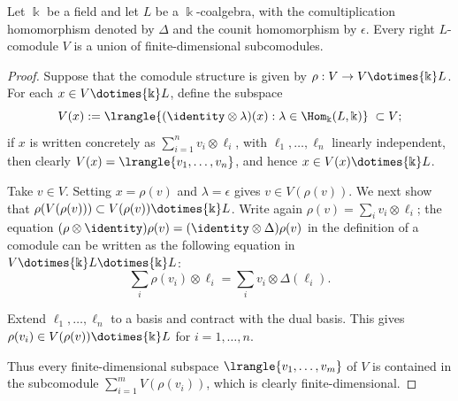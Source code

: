 \begin{lemma}\label{prop:comodule-fd-union}
	Let $\Bbbk$ be a field and let $L$ be a $\Bbbk$-coalgebra, with the
	comultiplication homomorphism denoted by $\Delta$ and the counit
	homomorphism by $\epsilon$. Every right $L$-comodule $V$ is a union of
	finite-dimensional subcomodules.
\end{lemma}
\begin{proof}
	Suppose that the comodule structure is given by
	$\rho: V \to V \dotimes{\Bbbk} L$. For each
	$x \in V \dotimes{\Bbbk} L$, define the subspace
	\[ V(x) := \lrangle{(\identity \otimes \lambda)(x) : \lambda \in \Hom_{\Bbbk}(L, \Bbbk) } \; \subset V ; \]
	if $x$ is written concretely as
	$\sum_{i=1}^n v_i \otimes \ell_i$, with
	$\ell_1, \ldots, \ell_n$ linearly independent, then clearly
	$V(x) = \lrangle{v_1, \ldots, v_n}$, and hence
	$x \in V(x) \dotimes{\Bbbk} L$.
	
	Take $v \in V$. Setting $x = \rho(v)$ and $\lambda = \epsilon$ gives
	$v \in V(\rho(v))$. We next show that
	$\rho(V(\rho(v))) \subset V(\rho(v)) \dotimes{\Bbbk} L$. Write again
	$\rho(v) = \sum_i v_i \otimes \ell_i$; the equation
	$(\rho \otimes \identity)\rho(v) = (\identity \otimes \Delta)\rho(v)$
	in the definition of a comodule can be written as the following equation
	in $V \dotimes{\Bbbk} L \dotimes{\Bbbk} L$:
	\[ \sum_i \rho(v_i) \otimes \ell_i = \sum_i v_i \otimes \Delta(\ell_i). \]
	
	Extend $\ell_1, \ldots, \ell_n$ to a basis and contract with the dual
	basis. This gives $\rho(v_i) \in V(\rho(v)) \dotimes{\Bbbk} L$ for
	$i = 1, \ldots, n$.
	
	Thus every finite-dimensional subspace $\lrangle{v_1, \ldots, v_m}$ of
	$V$ is contained in the subcomodule
	$\sum_{i=1}^m V(\rho(v_i))$, which is clearly finite-dimensional.
\end{proof}

